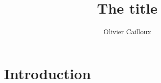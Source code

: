 \documentclass[version=last, pagesize, twoside=off, bibliography=totoc, 14pt, a4paper, french, english]{scrartcl}
\begin{document}
\title{The title}
\author{Olivier Cailloux}
\subject{Ze subject}%
\makeatletter
\makeatother
\maketitle

\section{Introduction}
\end{document}

